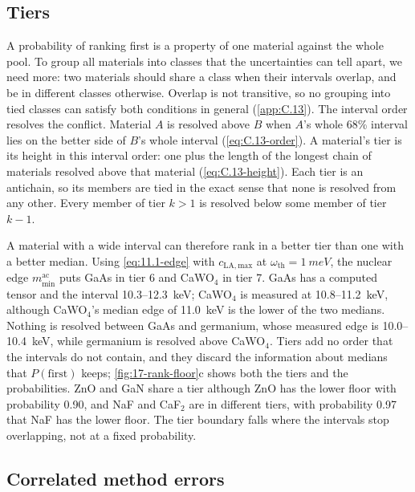\subsection{Tiers}\label{sec:17.6-tiers}

A probability of ranking first is a property of one material against the whole pool. To group all materials into classes that the uncertainties can tell apart, we need more: two materials should share a class when their intervals overlap, and be in different classes otherwise. Overlap is not transitive, so no grouping into tied classes can satisfy both conditions in general (\cref{app:C.13}). The interval order resolves the conflict. Material $A$ is resolved above $B$ when $A$'s whole 68\% interval lies on the better side of $B$'s whole interval (\cref{eq:C.13-order}). A material's tier is its height in this interval order: one plus the length of the longest chain of materials resolved above that material (\cref{eq:C.13-height}). Each tier is an antichain, so its members are tied in the exact sense that none is resolved from any other. Every member of tier $k > 1$ is resolved below some member of tier $k - 1$.

A material with a wide interval can therefore rank in a better tier than one with a better median. Using \cref{eq:11.1-edge} with $c_{\mathrm{LA,max}}$ at $\omega_{\mathrm{th}} = \SI{1}{meV}$, the nuclear edge $m_{\mathrm{min}}^{\mathrm{ac}}$ puts GaAs in tier 6 and CaWO$_4$ in tier 7. GaAs has a computed tensor and the interval 10.3--\SI{12.3}{keV}; CaWO$_4$ is measured at 10.8--\SI{11.2}{keV}, although CaWO$_4$'s median edge of \SI{11.0}{keV} is the lower of the two medians. Nothing is resolved between GaAs and germanium, whose measured edge is 10.0--\SI{10.4}{keV}, while germanium is resolved above CaWO$_4$. Tiers add no order that the intervals do not contain, and they discard the information about medians that $P(\mathrm{first})$ keeps; \cref{fig:17-rank-floor}c shows both the tiers and the probabilities. ZnO and GaN share a tier although ZnO has the lower floor with probability 0.90, and NaF and CaF$_2$ are in different tiers, with probability 0.97 that NaF has the lower floor. The tier boundary falls where the intervals stop overlapping, not at a fixed probability.

\subsection{Correlated method errors}\label{sec:17.6-correlation}

